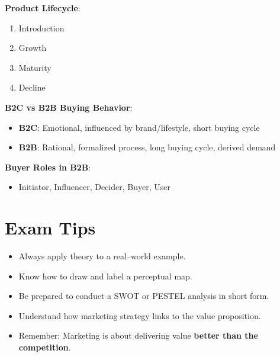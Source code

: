 \documentclass[12pt]{article}
\begin{document}
\textbf{Product Lifecycle}:
\begin{enumerate}[leftmargin=*]
    \item Introduction
    \item Growth
    \item Maturity
    \item Decline
\end{enumerate}

\textbf{B2C vs B2B Buying Behavior}:
\begin{itemize}[leftmargin=*]
    \item \textbf{B2C}: Emotional, influenced by brand/lifestyle, short buying cycle
    \item \textbf{B2B}: Rational, formalized process, long buying cycle, derived demand
\end{itemize}

\textbf{Buyer Roles in B2B}:
\begin{itemize}[leftmargin=*]
    \item Initiator, Influencer, Decider, Buyer, User
\end{itemize}

\section*{\faGraduationCap\hspace{0.5em} Exam Tips}

\begin{itemize}[leftmargin=*]
    \item Always apply theory to a real--world example.
    \item Know how to draw and label a perceptual map.
    \item Be prepared to conduct a SWOT or PESTEL analysis in short form.
    \item Understand how marketing strategy links to the value proposition.
    \item Remember: Marketing is about delivering value \textbf{better than the competition}.
\end{itemize}
\end{document}
